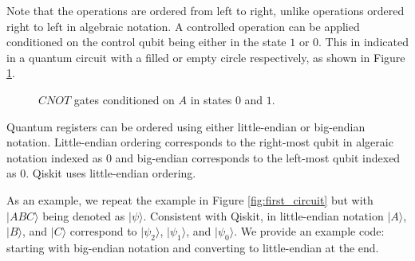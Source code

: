 \documentclass{article}
\begin{document}
Note that the operations are ordered from left to right, unlike operations ordered right to left in algebraic notation. A controlled operation can be applied conditioned on the control qubit being either in the state $1$ or  $0$. This in indicated in a quantum circuit with a filled or empty circle respectively, as shown in Figure \ref{fig:gate_conditions}.

\begin{figure}[h]

\centering
{}

\caption{$CNOT$ gates conditioned on $A$ in states $0$ and $1$.}
\label{fig:gate_conditions}

\end{figure}



Quantum registers can be ordered using either little-endian or big-endian notation. Little-endian ordering corresponds to the right-most qubit in algeraic notation indexed as $0$ and big-endian corresponds to the left-most qubit indexed as $0$. Qiskit uses little-endian ordering.

As an example, we repeat the example in Figure \ref{fig:first_circuit} but with $\lvert ABC \rangle$ being denoted as $\lvert \psi \rangle$. Consistent with Qiskit, in little-endian notation $\lvert A\rangle$, $\lvert B\rangle$, and $\lvert C\rangle$ correspond to $\lvert \psi _2 \rangle$, $\lvert \psi _1 \rangle$, and $\lvert \psi _0 \rangle$. We provide an example code: starting with big-endian notation and converting to little-endian at the end.



\end{document}
